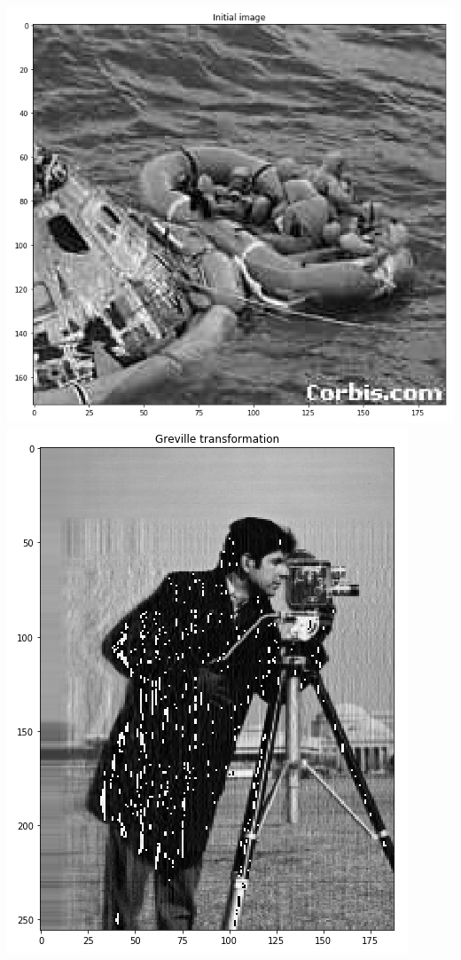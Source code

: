 \documentclass[12pt, a4paper]{article}
\begin{document}
\begin{enumerate}
  \includegraphics[scale=0.39]{initial_2.png} \\
  \includegraphics[scale=0.39]{Greville_1.png}

\end{enumerate}
\end{document}
